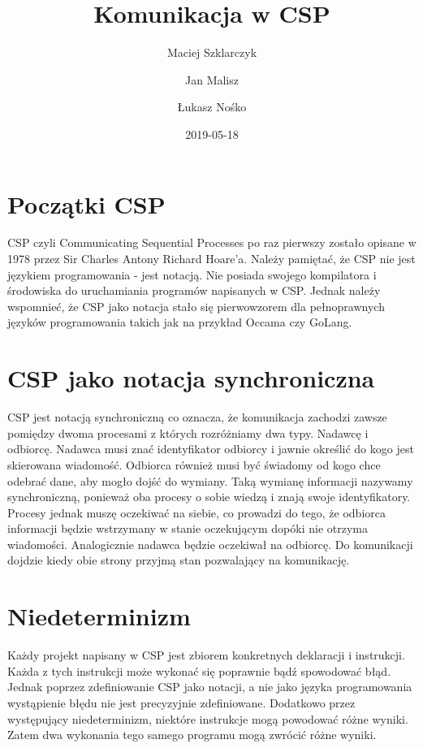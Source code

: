 \documentclass[12pt,a4paper]{article}
\title{Komunikacja w CSP}
\author{
Maciej Szklarczyk
\and
Jan Malisz
\and
Łukasz Nośko
}
\date{2019-05-18}
\begin{document}
  \maketitle
  \thispagestyle{empty}
  \newpage

  \tableofcontents
  \newpage

  \section{Początki CSP}
  CSP czyli Communicating Sequential Processes po raz pierwszy zostało opisane w 1978 przez Sir Charles Antony Richard Hoare’a.
  Należy pamiętać, że CSP nie jest językiem programowania - jest notacją.
  Nie posiada swojego kompilatora i środowiska do uruchamiania programów napisanych w CSP.
  Jednak należy wspomnieć, że CSP jako notacja stało się pierwowzorem dla pełnoprawnych języków programowania takich jak na przykład Occama czy GoLang.

  \section{CSP jako notacja synchroniczna}
  CSP jest notacją synchroniczną co oznacza, że komunikacja zachodzi zawsze pomiędzy dwoma procesami z których rozróżniamy dwa typy.
  Nadawcę i odbiorcę.
  Nadawca musi znać identyfikator odbiorcy i jawnie określić do kogo jest skierowana wiadomość.
  Odbiorca również musi być świadomy od kogo chce odebrać dane, aby mogło dojść do wymiany.
  Taką wymianę informacji nazywamy synchroniczną, ponieważ oba procesy o sobie wiedzą i znają swoje identyfikatory.
  Procesy jednak muszę oczekiwać na siebie, co prowadzi do tego, że odbiorca informacji będzie wstrzymany w stanie oczekującym dopóki nie otrzyma wiadomości.
  Analogicznie nadawca będzie oczekiwał na odbiorcę.
  Do komunikacji dojdzie kiedy obie strony przyjmą stan pozwalający na komunikację.

  \section{Niedeterminizm}
  Każdy projekt napisany w CSP jest zbiorem konkretnych deklaracji i instrukcji.
  Każda z tych instrukcji może wykonać się poprawnie bądź spowodować błąd.
  Jednak poprzez zdefiniowanie CSP jako notacji, a nie jako języka programowania wystąpienie błędu nie jest precyzyjnie zdefiniowane.
  Dodatkowo przez występujący niedeterminizm, niektóre instrukcje mogą powodować różne wyniki.
  Zatem dwa wykonania tego samego programu mogą zwrócić różne wyniki.
\end{document}
